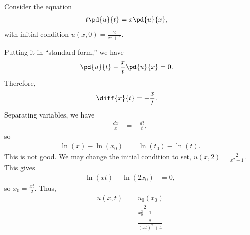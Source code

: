 \documentclass[10pt]{mypackage}
\begin{document}
\begin{example}
  Consider the equation
  \begin{align*}
    t \pd{u}{t} &= x \pd{u}{x},
  \end{align*}
  with initial condition $u\left( x,0 \right) = \frac{2}{x^2 + 1}$.\newline

  Putting it in ``standard form,'' we have
  \begin{align*}
    \pd{u}{t} - \frac{x}{t} \pd{u}{x} &= 0.
  \end{align*}
  Therefore,
  \begin{align*}
    \diff{x}{t} &= -\frac{x}{t}.
  \end{align*}
  Separating variables, we have
  \begin{align*}
    \frac{dx}{x} &= -\frac{dt}{t},
  \end{align*}
  so
  \begin{align*}
    \ln\left( x \right)-\ln\left( x_0 \right) &= \ln\left(t_0  \right) - \ln\left( t \right).
  \end{align*}
  This is not good. We may change the initial condition to set, $u\left( x,2 \right) = \frac{2}{x^2 + 1}$. This gives
  \begin{align*}
    \ln\left( xt \right) - \ln\left( 2x_0 \right) &= 0,
  \end{align*}
  so $x_0 = \frac{xt}{2}$. Thus,
  \begin{align*}
    u\left( x,t \right) &= u_0\left( x_0 \right)\\
                        &= \frac{2}{x_0^2 + 1}\\
                        &= \frac{8}{\left( xt \right)^2 + 4}
  \end{align*}
\end{example}
\end{document}
